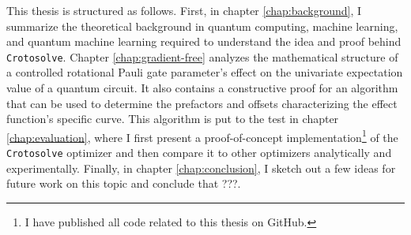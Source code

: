 This thesis is structured as follows.
First, in chapter \ref{chap:background}, I summarize the theoretical background
in quantum computing, machine learning, and quantum machine learning required to
understand the idea and proof behind \texttt{Crotosolve}.
Chapter \ref{chap:gradient-free} analyzes the mathematical structure of a
controlled rotational Pauli gate parameter's effect on the univariate
expectation value of a quantum circuit.
It also contains a constructive proof for an algorithm that can be used to
determine the prefactors and offsets characterizing the effect function's
specific curve.
This algorithm is put to the test in chapter \ref{chap:evaluation}, where I
first present a proof-of-concept implementation\footnote{I have published all
code related to this thesis on GitHub.} of the \texttt{Crotosolve} optimizer
and then compare it to other optimizers analytically and experimentally.
Finally, in chapter \ref{chap:conclusion}, I sketch out a few ideas for future
work on this topic and conclude that ???.

